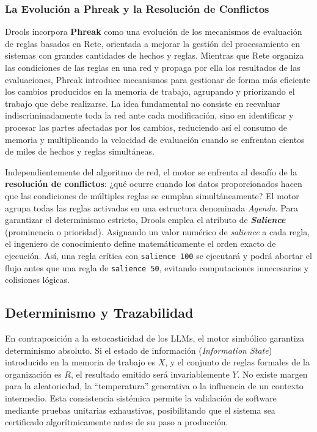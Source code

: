 \documentclass[12pt,a4paper]{report}
\begin{document}
\subsubsection{La Evolución a Phreak y la Resolución de Conflictos}
Drools incorpora \textbf{Phreak} como una evolución de los mecanismos de evaluación de reglas basados en Rete, orientada a mejorar la gestión del procesamiento en sistemas con grandes cantidades de hechos y reglas. Mientras que Rete organiza las condiciones de las reglas en una red y propaga por ella los resultados de las evaluaciones, Phreak introduce mecanismos para gestionar de forma más eficiente los cambios producidos en la memoria de trabajo, agrupando y priorizando el trabajo que debe realizarse. La idea fundamental no consiste en reevaluar indiscriminadamente toda la red ante cada modificación, sino en identificar y procesar las partes afectadas por los cambios, reduciendo así el consumo de memoria y multiplicando la velocidad de evaluación cuando se enfrentan cientos de miles de hechos y reglas simultáneas.

Independientemente del algoritmo de red, el motor se enfrenta al desafío de la \textbf{resolución de conflictos}: ¿qué ocurre cuando los datos proporcionados hacen que las condiciones de múltiples reglas se cumplan simultáneamente? El motor agrupa todas las reglas activadas en una estructura denominada \textit{Agenda}. Para garantizar el determinismo estricto, Drools emplea el atributo de \textbf{\textit{Salience}} (prominencia o prioridad). Asignando un valor numérico de \textit{salience} a cada regla, el ingeniero de conocimiento define matemáticamente el orden exacto de ejecución. Así, una regla crítica con \texttt{salience 100} se ejecutará y podrá abortar el flujo antes que una regla de \texttt{salience 50}, evitando computaciones innecesarias y colisiones lógicas.

\subsection{Determinismo y Trazabilidad}

En contraposición a la estocasticidad de los LLMs, el motor simbólico garantiza determinismo absoluto. Si el estado de información (\textit{Information State}) introducido en la memoria de trabajo es $X$, y el conjunto de reglas formales de la organización es $R$, el resultado emitido será invariablemente $Y$. No existe margen para la aleatoriedad, la ``temperatura'' generativa o la influencia de un contexto intermedio. Esta consistencia sistémica permite la validación de software mediante pruebas unitarias exhaustivas, posibilitando que el sistema sea certificado algorítmicamente antes de su paso a producción.
\end{document}
